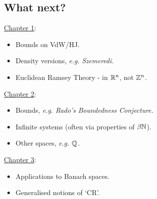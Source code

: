 \documentclass[10pt]{article}
\begin{document}
\subsection*{What next?}

\underline{Chapter 1}:\ 
\begin{itemize}
    \item Bounds on VdW/HJ.
    \item Density versions, \it{e.g.} Szemeredi.
    \item Euclidean Ramsey Theory - in $\mathbb{R}^n$, not $\mathbb{Z}^n$.
\end{itemize}

\underline{Chapter 2}:\ 
\begin{itemize}
    \item Bounds, \it{e.g.} Rado's Boundedness Conjecture.
    \item Infinite systems (often via properties of $\beta\mathbb{N}$).
    \item Other spaces, \it{e.g.} $\mathbb{Q}$.
\end{itemize}

\underline{Chapter 3}:\ 
\begin{itemize}
    \item Applications to Banach spaces.
    \item Generalised notions of `CR'.
\end{itemize}
\end{document}
